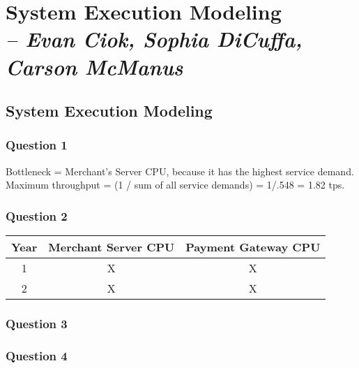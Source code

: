 \chapter{System Execution Modeling \\
  \small{\textit{-- Evan Ciok, Sophia DiCuffa, Carson McManus}}
  \label{Chapter::LabThree}}


\section{System Execution Modeling \label{Section::LabThree}}

\subsection{Question 1}
Bottleneck = Merchant’s Server CPU, because it has the highest service demand.
Maximum throughput = (1 / sum of all service demands) = 1/.548 = 1.82 tps.

\subsection{Question 2}

\begin{center}
  \begin{tabular}{ |c|c|c| }
    \hline
    Year & Merchant Server CPU & Payment Gateway CPU \\
    \hline
    1    & X                   & X                   \\
    \hline
    2    & X                   & X                   \\
    \hline
  \end{tabular}
\end{center}

\subsection{Question 3}

\subsection{Question 4}
